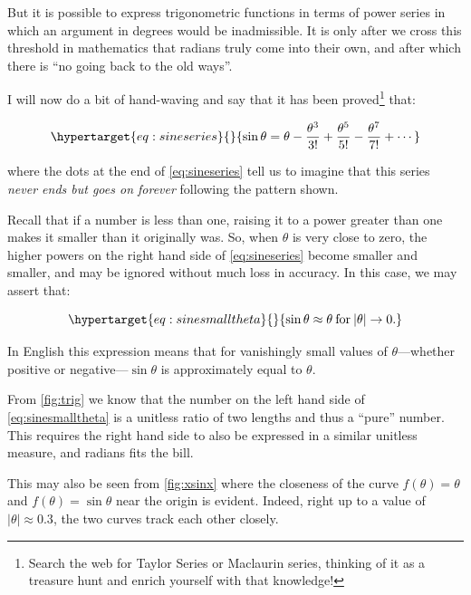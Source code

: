 \documentclass[
  a4paper,
]{article}
\begin{document}
But it is possible to express trigonometric functions in terms of power
series in which an argument in degrees would be inadmissible. It is only
after we cross this threshold in mathematics that radians truly come
into their own, and after which there is ``no going back to the old
ways''.

I will now do a bit of hand-waving and say that it has been
proved\footnote{Search the web for Taylor Series or Maclaurin series,
  thinking of it as a treasure hunt and enrich yourself with that
  knowledge!} that:

\begin{equation}\protect\hypertarget{eq:sineseries}{}{
\sin\theta = \theta - \frac{\theta^3}{3!} + \frac{\theta^5}{5!} - \frac{\theta^7}{7!} + \cdots
}\label{eq:sineseries}\end{equation}

where the dots at the end of \cref{eq:sineseries} tell us to imagine
that this series \emph{never ends but goes on forever} following the
pattern shown.

Recall that if a number is less than one, raising it to a power greater
than one makes it smaller than it originally was. So, when \(\theta\) is
very close to zero, the higher powers on the right hand side of
\cref{eq:sineseries} become smaller and smaller, and may be ignored
without much loss in accuracy. In this case, we may assert that:

\begin{equation}\protect\hypertarget{eq:sinesmalltheta}{}{
\sin\theta\approx\theta \:\text{for}\: \lvert\theta\rvert \to 0.
}\label{eq:sinesmalltheta}\end{equation}

In English this expression means that for vanishingly small values of
\(\theta\)---whether positive or negative---\(\sin\theta\) is
approximately equal to \(\theta\).

From \cref{fig:trig} we know that the number on the left hand side of
\cref{eq:sinesmalltheta} is a unitless ratio of two lengths and thus a
``pure'' number. This requires the right hand side to also be expressed
in a similar unitless measure, and radians fits the bill.

This may also be seen from \cref{fig:xsinx} where the closeness of the
curve \(f(\theta) = \theta\) and \(f(\theta) = \sin\theta\) near the
origin is evident. Indeed, right up to a value of
\(\lvert\theta\rvert\approx 0.3\), the two curves track each other
closely.
\end{document}
